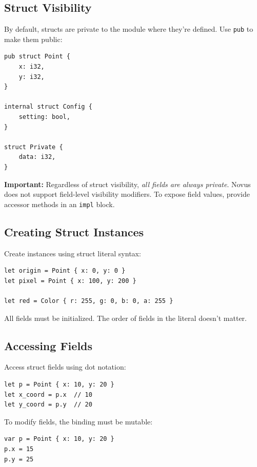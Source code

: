 \subsection{Struct Visibility}

By default, structs are private to the module where they're defined. Use \texttt{pub} to make them public:

\begin{lstlisting}
pub struct Point {
    x: i32,
    y: i32,
}

internal struct Config {
    setting: bool,
}

struct Private {
    data: i32,
}
\end{lstlisting}

\textbf{Important:} Regardless of struct visibility, \textit{all fields are always private}. Novus does not support field-level visibility modifiers. To expose field values, provide accessor methods in an \texttt{impl} block.

\subsection{Creating Struct Instances}

Create instances using struct literal syntax:

\begin{lstlisting}
let origin = Point { x: 0, y: 0 }
let pixel = Point { x: 100, y: 200 }

let red = Color { r: 255, g: 0, b: 0, a: 255 }
\end{lstlisting}

All fields must be initialized. The order of fields in the literal doesn't matter.

\subsection{Accessing Fields}

Access struct fields using dot notation:

\begin{lstlisting}
let p = Point { x: 10, y: 20 }
let x_coord = p.x  // 10
let y_coord = p.y  // 20
\end{lstlisting}

To modify fields, the binding must be mutable:

\begin{lstlisting}
var p = Point { x: 10, y: 20 }
p.x = 15
p.y = 25
\end{lstlisting}

